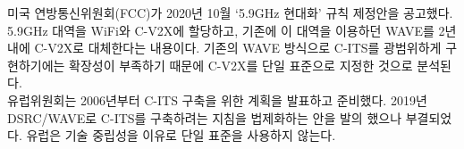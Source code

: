     미국 연방통신위원회(FCC)가 2020년 10월 ‘5.9GHz 현대화’ 규칙 제정안을 공고했다. 5.9GHz 대역을 WiFi와 C-V2X에 할당하고, 기존에 이 대역을 이용하던 WAVE를 2년 내에 C-V2X로 대체한다는 내용이다. 기존의 WAVE 방식으로 C-ITS를 광범위하게 구현하기에는 확장성이 부족하기 때문에 C-V2X를 단일 표준으로 지정한 것으로 분석된다. \\
    유럽위원회는 2006년부터 C-ITS 구축을 위한 계획을 발표하고 준비했다. 2019년 DSRC/WAVE로 C-ITS를 구축하려는 지침을 법제화하는 안을 발의 했으나 부결되었다. 유럽은 기술 중립성을 이유로 단일 표준을 사용하지 않는다. \\
\clearpage